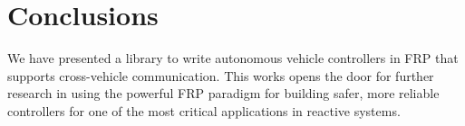 \section{Conclusions}

We have presented a library to write autonomous vehicle controllers in FRP that supports cross-vehicle communication.
This works opens the door for further research in using the powerful FRP paradigm for building safer, more reliable controllers for one of the most critical applications in reactive systems.


